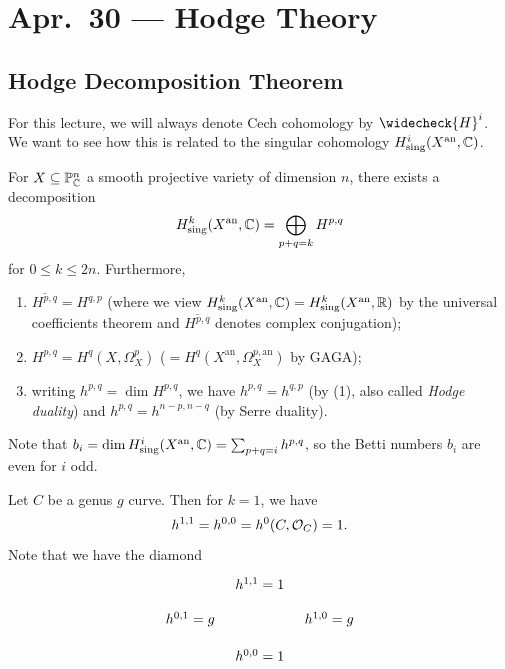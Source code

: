 \chapter{Apr.~30 --- Hodge Theory}

\section{Hodge Decomposition Theorem}

\begin{remark}
  For this lecture, we will always denote
  Cech cohomology by $\widecheck{H}^i$.
  We want to see how this is related
  to the singular cohomology
  $H^i_{\mathrm{sing}}(X^{\mathrm{an}}, \mathbb{C})$.
\end{remark}

\begin{theorem}
  For $X \subseteq \mathbb{P}^n_{\mathbb{C}}$ a smooth
  projective variety of dimension $n$, there
  exists a decomposition
  \[
    H^k_{\mathrm{sing}}(X^{\mathrm{an}}, \mathbb{C})
    = \bigoplus_{p + q = k} H^{p, q}
  \]
  for $0 \le k \le 2n$. Furthermore,
  \begin{enumerate}
    \item $\overline{H^{p, q}} = H^{q, p}$ (where we view $H^k_{\mathrm{sing}}(X^{\mathrm{an}}, \mathbb{C}) = H^k_{\mathrm{sing}}(X^{\mathrm{an}}, \mathbb{R})$ by the universal coefficients theorem and $\overline{H^{p, q}}$ denotes complex conjugation);
    \item $H^{p, q} = H^q(X, \Omega_X^p)$
      ($= H^q(X^{\mathrm{an}}, \Omega_{X}^{p, \mathrm{an}})$ by GAGA);
    \item writing $h^{p, q} = \dim H^{p, q}$,
      we have $h^{p, q} = h^{q, p}$
      (by (1), also called \emph{Hodge duality})
      and $h^{p, q} = h^{n - p, n - q}$
      (by Serre duality).
  \end{enumerate}
\end{theorem}

\begin{remark}
  Note that $b_i = \dim H^i_{\mathrm{sing}}(X^{\mathrm{an}}, \mathbb{C}) = \sum_{p + q = i} h^{p, q}$,
  so the Betti numbers
  $b_i$ are even for $i$ odd.
\end{remark}

\begin{example}
  Let $C$ be a genus $g$ curve. Then
  for $k = 1$, we have
  \[
    h^{1, 1} = h^{0, 0}
    = h^0(C, \mathcal{O}_C) = 1.
  \]
  Note that we have the diamond
  \[
    \begin{tikzcd}[row sep=small, column sep=tiny]
      & h^{1, 1} = 1 \\
      h^{0, 1} = g & & h^{1, 0} = g \\
      & h^{0, 0} = 1
    \end{tikzcd}
  \]
\end{example}

